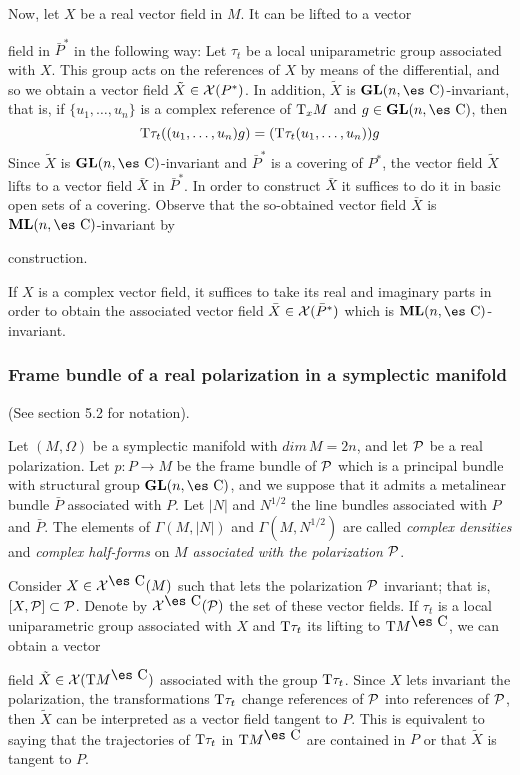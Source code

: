 \documentclass[12pt]{article}
\def\GL{{\bf GL}(n,\Complex )}
\def\ML{{\bf ML}(n,\Complex )}
\def\Complex{\mbox{\es C}}
\def\Tan{{\rm T}}
\begin{document}
Now, let $X$ be a real vector field in $M$. It can be lifted to a vector

field in $\bar P^*$
in the following way:
Let $\tau_t$ be a local uniparametric group associated with $X$.
This group acts on the references of $X$ by means of the differential,
and so we obtain a vector field $\tilde X \in {\cal X}(P^*)$.
In addition, $\tilde X$ is $\GL$-invariant, that is, if
$\{ u_1,\ldots ,u_n \}$ is a complex reference of $\Tan_x M$ and $g \in
\GL$, then
$$
\Tan \tau_t ((u_1,\ldots ,u_n)g) = (\Tan \tau_t (u_1,\ldots ,u_n))g
$$
Since $\tilde X$ is $\GL$-invariant and $\bar P^*$ is a covering of
$P^*$,
the vector field $\tilde X$ lifts to a vector field $\bar X$ in $\bar
P^*$.
In order to construct $\bar X$ it suffices to do it in basic open sets
of a covering.
Observe that the so-obtained vector field $\bar X$ is $\ML$-invariant by

construction.

If $X$ is a complex vector field, it suffices to take its real and
imaginary parts
 in order to obtain the associated vector field
 $\bar X \in {\cal X}(\bar P^*)$
which is $\ML$-invariant.



\subsubsection{Frame bundle of a real polarization in a symplectic
manifold}

(See section 5.2 for notation).

Let $(M,\Omega )$ be a symplectic manifold with $dim\, M = 2n$,
and let ${\cal P}$ be a real polarization.
Let $p:P \to M$ be the frame bundle of ${\cal P}$
which is a principal bundle with structural group
$\GL$, and we suppose that it admits a
metalinear bundle $\bar P$ associated with $P$.
 Let $| N |$ and $N^{1/2}$ the line bundles associated with
 $P$ and $\bar P$.
The elements of $\Gamma (M,| N | )$ and $\Gamma (M,N^{1/2})$
are called {\it complex densities} and {\it complex half-forms}
on $M$ {\it associated with the polarization ${\cal P}$}.

Consider $X \in {\cal X}^{\Complex}(M)$ such that lets the polarization
${\cal P}$ invariant;
that is, $[X,{\cal P}] \subset {\cal P}$.
Denote by ${\cal X}^{\Complex}({\cal P})$ the set of these vector
fields.
If $\tau_t$ is a local uniparametric group associated with $X$ and
$\Tan \tau_t$ its lifting to $\Tan M^{\Complex}$, we can obtain a vector

field
$\tilde X \in {\cal X}(\Tan M^{\Complex})$ associated with the group
$\Tan \tau_t$.
Since $X$ lets invariant the polarization, the transformations $\Tan
\tau_t$
change references of ${\cal P}$ into references of ${\cal P}$,
then $\tilde X$ can be interpreted as a vector field tangent to $P$.
This is equivalent to saying that the trajectories of $\Tan \tau_t$ in
$\Tan M^{\Complex}$
are contained in $P$ or that $\tilde X$ is tangent to $P$.
\end{document}
